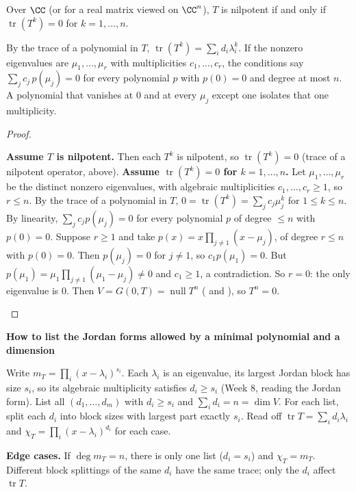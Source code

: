 \documentclass[10pt]{scrartcl}
\DeclareMathOperator{\tr}{tr}\DeclareMathOperator{\nul}{null}\DeclareMathOperator{\range}{range}\DeclareMathOperator{\spn}{span}
\newenvironment{methodbox}[1]{\begin{mdframed}[style=mdbluebox,linecolor=NavyBlue,backgroundcolor=NavyBlue!3]\textbf{\color{NavyBlue}#1}\par\vspace{2pt}}{\end{mdframed}}
\begin{document}
\begin{proposition*}
  Over $\CC$ (or for a real matrix viewed on $\CC^n$), $T$ is nilpotent if and only if $\tr(T^k)=0$ for $k=1,\dots,n$.
\end{proposition*}
\begin{ideabox}
By the trace of a polynomial in $T$, $\tr(T^k)=\sum_id_i\lambda_i^k$. If the nonzero eigenvalues are $\mu_1,\dots,\mu_r$ with multiplicities $c_1,\dots,c_r$, the conditions say $\sum_jc_j\,p(\mu_j)=0$ for every polynomial $p$ with $p(0)=0$ and degree at most $n$. A polynomial that vanishes at $0$ and at every $\mu_j$ except one isolates that one multiplicity.
\end{ideabox}
\begin{proof}
  \begin{steps}
    \ii \textbf{Assume $T$ is nilpotent.} Then each $T^k$ is nilpotent, so $\tr(T^k)=0$ (trace of a nilpotent operator, above).
    \ii \textbf{Assume $\tr(T^k)=0$ for $k=1,\dots,n$.} Let $\mu_1,\dots,\mu_r$ be the distinct nonzero eigenvalues, with algebraic multiplicities $c_1,\dots,c_r\ge1$, so $r\le n$. By the trace of a polynomial in $T$, $0=\tr(T^k)=\sum_jc_j\mu_j^k$ for $1\le k\le n$. By linearity, $\sum_jc_jp(\mu_j)=0$ for every polynomial $p$ of degree $\le n$ with $p(0)=0$.
    \ii Suppose $r\ge1$ and take $p(x)=x\prod_{j\ne1}(x-\mu_j)$, of degree $r\le n$ with $p(0)=0$. Then $p(\mu_j)=0$ for $j\ne1$, so $c_1p(\mu_1)=0$. But $p(\mu_1)=\mu_1\prod_{j\ne1}(\mu_1-\mu_j)\ne0$ and $c_1\ge1$, a contradiction. So $r=0$: the only eigenvalue is $0$.
    \ii Then $V=G(0,T)=\nul T^n$ ( and ), so $T^n=0$.
  \end{steps}
\end{proof}

\begin{methodbox}{How to list the Jordan forms allowed by a minimal polynomial and a dimension}
\begin{enumerate}[label=\arabic*.,leftmargin=1.5em,itemsep=2pt,topsep=2pt]
  \ii Write $m_T=\prod_i(x-\lambda_i)^{s_i}$. Each $\lambda_i$ is an eigenvalue, its largest Jordan block has size $s_i$, so its algebraic multiplicity satisfies $d_i\ge s_i$ (Week 8, reading the Jordan form).
  \ii List all $(d_1,\dots,d_m)$ with $d_i\ge s_i$ and $\sum_id_i=n=\dim V$.
  \ii For each list, split each $d_i$ into block sizes with largest part exactly $s_i$.
  \ii Read off $\tr T=\sum_id_i\lambda_i$ and $\chi_T=\prod_i(x-\lambda_i)^{d_i}$ for each case.
\end{enumerate}
\textbf{Edge cases.} If $\deg m_T=n$, there is only one list ($d_i=s_i$) and $\chi_T=m_T$. Different block splittings of the same $d_i$ have the same trace; only the $d_i$ affect $\tr T$.
\end{methodbox}
\end{document}
